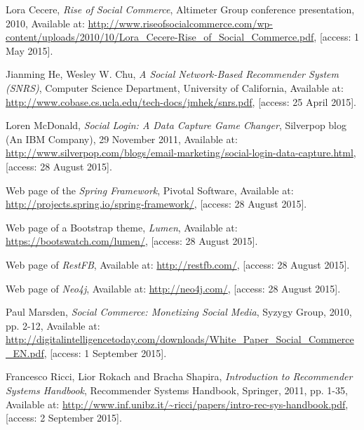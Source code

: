 \documentclass[12pt]{report}
\begin{document}
\begin{thebibliography}{99}

Lora Cecere, \textit{Rise of Social Commerce}, Altimeter Group conference presentation, 2010, Available at: \url{http://www.riseofsocialcommerce.com/wp-content/uploads/2010/10/Lora_Cecere-Rise_of_Social_Commerce.pdf}, [access: 1 May 2015].

Jianming He, Wesley W. Chu, \textit{A Social Network-Based Recommender System (SNRS)}, Computer Science Department, University of California, Available at: \url{http://www.cobase.cs.ucla.edu/tech-docs/jmhek/snrs.pdf}, [access: 25 April 2015].

Loren McDonald, \textit{Social Login: A Data Capture Game Changer}, Silverpop blog (An IBM Company), 29 November 2011, Available at: \url{http://www.silverpop.com/blogs/email-marketing/social-login-data-capture.html}, [access: 28 August 2015].

Web page of the \textit{Spring Framework}, Pivotal Software, Available at: \url{http://projects.spring.io/spring-framework/}, [access: 28 August 2015].

Web page of a Bootstrap theme, \textit{Lumen}, Available at: \url{https://bootswatch.com/lumen/}, [access: 28 August 2015].

Web page of \textit{RestFB}, Available at: \url{http://restfb.com/}, [access: 28 August 2015].

Web page of \textit{Neo4j}, Available at: \url{http://neo4j.com/}, [access: 28 August 2015].

Paul Marsden, \textit{Social Commerce: Monetizing Social Media}, Syzygy Group, 2010, pp. 2-12, Available at: \url{http://digitalintelligencetoday.com/downloads/White_Paper_Social_Commerce_EN.pdf}, [access: 1 September 2015].

Francesco Ricci, Lior Rokach and Bracha Shapira, \textit{Introduction to Recommender Systems Handbook}, Recommender Systems Handbook, Springer, 2011, pp. 1-35, Available at: \url{http://www.inf.unibz.it/~ricci/papers/intro-rec-sys-handbook.pdf}, [access: 2 September 2015].

\end{thebibliography}

\listoffigures

\listoftables
\end{document}
